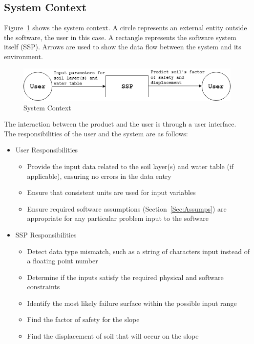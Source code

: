 \documentclass[12pt]{article}
\begin{document}
\subsection{System Context}
\label{Sec:SysContext}
Figure~\ref{Figure:sysCtxDiag} shows the system context. A circle represents an external entity outside the software, the user in this case. A rectangle represents the software system itself (SSP). Arrows are used to show the data flow between the system and its environment.
\begin{figure}
\begin{center}
\includegraphics[width=\textwidth]{../../../datafiles/SSP/SystemContextFigure.png}
\caption{System Context}
\label{Figure:sysCtxDiag}
\end{center}
\end{figure}
The interaction between the product and the user is through a user interface. The responsibilities of the user and the system are as follows:
\begin{itemize}
\item{User Responsibilities}
\begin{itemize}
\item{Provide the input data related to the soil layer(s) and water table (if applicable), ensuring no errors in the data entry}
\item{Ensure that consistent units are used for input variables}
\item{Ensure required software assumptions (Section~\ref{Sec:Assumps}) are appropriate for any particular problem input to the software}
\end{itemize}
\item{SSP Responsibilities}
\begin{itemize}
\item{Detect data type mismatch, such as a string of characters  input instead of a floating point number}
\item{Determine if the inputs satisfy the required physical and software constraints}
\item{Identify the most likely failure surface within the possible input range}
\item{Find the factor of safety for the slope}
\item{Find the displacement of soil that will occur on the slope}
\end{itemize}
\end{itemize}
\end{document}
